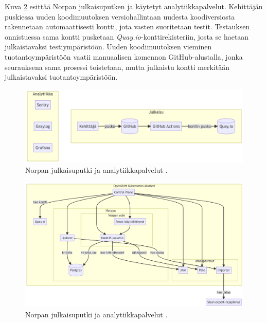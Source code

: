 Kuva \ref{fig:norppa:deployment} esittää Norpan julkaisuputken ja käytetyt analytiikkapalvelut.
Kehittäjän puskiessa uuden koodimuutoksen versiohallintaan uudesta koodiversiosta rakennetaan automaattisesti kontti, jota vasten suoritetaan testit.
Testauksen onnistuessa sama kontti pusketaan \textit{Quay.io}-konttirekisteriin, josta se haetaan julkaistavaksi testiympäristöön.
Uuden koodimuutoksen vieminen tuotantoympäristöön vaatii manuaalisen komennon GitHub-alustalla, jonka seurauksena sama prosessi toistetaan, mutta julkaistu kontti merkitään julkaistavaksi tuotantoympäristöön.

\begin{figure}[ht]
\begin{center}
\includegraphics[width=1\textwidth]{figures/norppa_deployment.png}
\caption{Norpan julkaisuputki ja analytiikkapalvelut \cite{Norppa23}\label{fig:norppa:deployment}.}
\end{center}
\end{figure}

\begin{figure}[ht]
\begin{center}
\includegraphics[width=1\textwidth]{figures/norppa_architecture.png}
\caption{Norpan julkaisuputki ja analytiikkapalvelut \cite{Norppa23}\label{fig:norppa:deployment}.}
\end{center}
\end{figure}